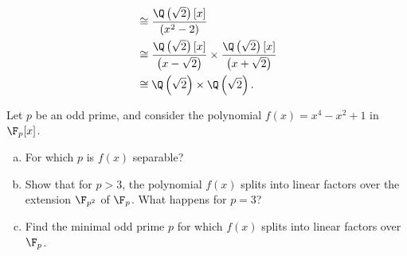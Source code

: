 \documentclass[10pt]{mypackage}
\begin{document}
\begin{solution}
\begin{enumerate}[(a)]
\begin{align*}
                                                                        &\cong \frac{\Q\left( \sqrt{2} \right)[x]}{\left( x^2-2 \right)}\\
                                                                        &\cong \frac{\Q\left( \sqrt{2} \right)[x]}{\left( x-\sqrt{2} \right)} \times \frac{\Q\left( \sqrt{2} \right)[x]}{\left( x + \sqrt{2} \right)}\\
                                                                        &\cong \Q\left( \sqrt{2} \right)\times \Q\left( \sqrt{2} \right).
      \end{align*}
  \end{enumerate}
\end{solution}
\begin{problem}[Problem 6]
  Let $p$ be an odd prime, and consider the polynomial $f(x) = x^4-x^2+1$ in $\F_p[x]$.
  \begin{enumerate}[(a)]
    \item For which $p$ is $f(x)$ separable?
    \item Show that for $p > 3$, the polynomial $f(x)$ splits into linear factors over the extension $\F_{p^2}$ of $\F_p$. What happens for $p = 3$?
    \item Find the minimal odd prime $p$ for which $f(x)$ splits into linear factors over $\F_p$.
  \end{enumerate}
\end{problem}
\end{document}
